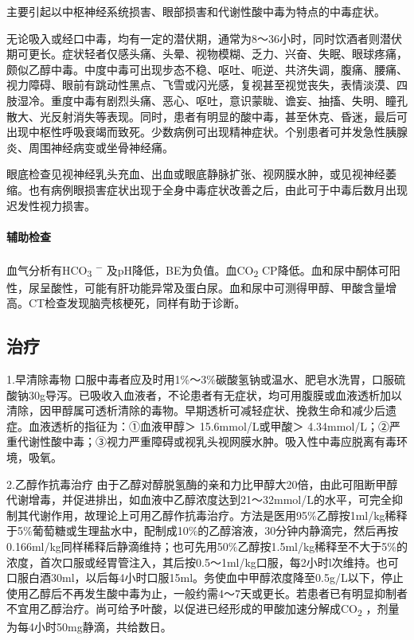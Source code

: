 主要引起以中枢神经系统损害、眼部损害和代谢性酸中毒为特点的中毒症状。

无论吸入或经口中毒，均有一定的潜伏期，通常为8～36小时，同时饮酒者则潜伏期可更长。症状轻者仅感头痛、头晕、视物模糊、乏力、兴奋、失眠、眼球疼痛，颇似乙醇中毒。中度中毒可出现步态不稳、呕吐、呃逆、共济失调，腹痛、腰痛、视力障碍、眼前有跳动性黑点、飞雪或闪光感，复视甚至视觉丧失，表情淡漠、四肢湿冷。重度中毒有剧烈头痛、恶心、呕吐，意识蒙眬、谵妄、抽搐、失明、瞳孔散大、光反射消失等表现。同时，患者有明显的酸中毒，甚至休克、昏迷，最后可出现中枢性呼吸衰竭而致死。少数病例可出现精神症状。个别患者可并发急性胰腺炎、周围神经病变或坐骨神经痛。

眼底检查见视神经乳头充血、出血或眼底静脉扩张、视网膜水肿，或见视神经萎缩。也有病例眼损害症状出现于全身中毒症状改善之后，由此可于中毒后数月出现迟发性视力损害。

\paragraph{辅助检查}

血气分析有HCO\textsubscript{3} \textsuperscript{−}
及pH降低，BE为负值。血CO\textsubscript{2}
CP降低。血和尿中酮体可阳性，尿呈酸性，可能有肝功能异常及蛋白尿。血和尿中可测得甲醇、甲酸含量增高。CT检查发现脑壳核梗死，同样有助于诊断。

\subsection{治疗}

1.早清除毒物
口服中毒者应及时用1\%～3\%碳酸氢钠或温水、肥皂水洗胃，口服硫酸钠30g导泻。已吸收入血液者，不论患者有无症状，均可用腹膜或血液透析加以清除，因甲醇属可透析清除的毒物。早期透析可减轻症状、挽救生命和减少后遗症。血液透析的指征为：①血液甲醇＞
15.6mmol/L或甲酸＞
4.34mmol/L；②严重代谢性酸中毒；③视力严重障碍或视乳头视网膜水肿。吸入性中毒应脱离有毒环境，吸氧。

2.乙醇作抗毒治疗
由于乙醇对醇脱氢酶的亲和力比甲醇大20倍，由此可阻断甲醇代谢增毒，并促进排出，如血液中乙醇浓度达到21～32mmol/L的水平，可完全抑制其代谢作用，故理论上可用乙醇作抗毒治疗。方法是医用95\%乙醇按1ml/kg稀释于5\%葡萄糖或生理盐水中，配制成10\%的乙醇溶液，30分钟内静滴完，然后再按0.166ml/kg同样稀释后静滴维持；也可先用50\%乙醇按1.5ml/kg稀释至不大于5\%的浓度，首次口服或经胃管注入，其后按0.5～1ml/kg口服，每2小时l次维持。也可口服白酒30ml，以后每4小时口服15ml。务使血中甲醇浓度降至0.5g/L以下，停止使用乙醇后不再发生酸中毒为止，一般约需4～7天或更长。若患者已有明显抑制者不宜用乙醇治疗。尚可给予叶酸，以促进已经形成的甲酸加速分解成CO\textsubscript{2}
，剂量为每4小时50mg静滴，共给数日。

